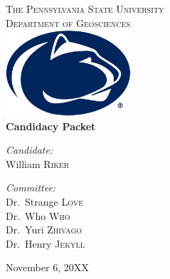 %
%
% 
%

\begin{titlepage}
\begin{center}

\textsc{\LARGE The Pennsylvania State University}\\[0.5cm]
\textsc{\Large Department of Geosciences}\\[1.5cm]

\includegraphics[width=0.35\textwidth]{title/PennStateLogo2005.jpg}~\\[1.2cm]

{ \huge \bfseries Candidacy Packet \\[0.4cm] }
\vspace{7 mm}

\emph{Candidate:}\\
William \textsc{Riker}

\vspace{3 mm}

\emph{Committee:} \\
Dr.~Strange \textsc{Love}\\
Dr.~Who \textsc{Who}\\
Dr.~Yuri \textsc{Zhivago}\\
Dr.~Henry \textsc{Jekyll}

\vfill

{\large November 6, 20XX}

\end{center}
\end{titlepage}